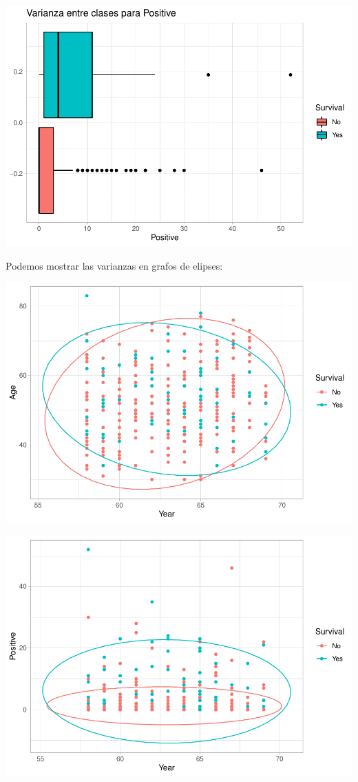 \documentclass[
]{article}
\begin{document}
\begin{center}\includegraphics{Clasificacion_files/figure-latex/unnamed-chunk-19-3} \end{center}

Podemos mostrar las varianzas en grafos de elipses:

\begin{center}\includegraphics{Clasificacion_files/figure-latex/unnamed-chunk-20-1} \end{center}

\begin{center}\includegraphics{Clasificacion_files/figure-latex/unnamed-chunk-20-2} \end{center}
\end{document}

